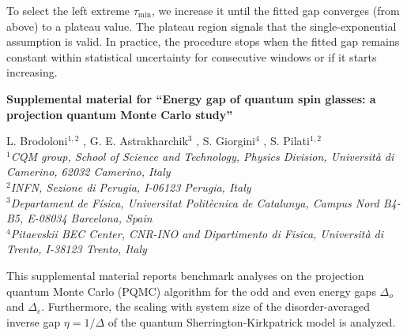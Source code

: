 \documentclass[aps,prl,twocolumn,superscriptaddress,nofootinbib]{revtex4-2}
\begin{document}
To select the left extreme $\tau_{\mathrm{min}}$, we increase it until  the fitted gap converges (from above) to a plateau value. The plateau region signals that the single-exponential assumption is valid. In practice, the procedure stops when the fitted gap remains constant within statistical uncertainty for consecutive windows or  if it starts increasing.






\clearpage
\pagestyle{plain}
\onecolumngrid
\setcounter{page}{1}
\renewcommand{\thefigure}{S\arabic{figure}}
\setcounter{figure}{0}
\begin{center}
  {\large\textbf{Supplemental material for ``Energy gap of quantum spin glasses: a projection quantum Monte Carlo study''}}

  \vspace{2em}
  { L. Brodoloni$^{1,2}$ , G. E. Astrakharchik$^{3}$ , S. Giorgini$^{4}$ , S. Pilati$^{1, 2}$ \\
  $^{1}$\small\textit{CQM group, School of Science and Technology, Physics Division, Università di Camerino, 62032 Camerino, Italy}\\
  $^{2}$\small\textit{INFN, Sezione di Perugia, I-06123 Perugia, Italy}\\
  $^{3}$\small\textit{Departament de Física, Universitat Politècnica de Catalunya, Campus Nord B4-B5, E-08034 Barcelona, Spain}\\
  $^{4}$\small\textit{Pitaevskii BEC Center, CNR-INO and Dipartimento di Fisica, Universit\`a di Trento, I-38123 Trento, Italy}\\
}

\end{center}

\vspace{0.5em}
\begin{center}
\begin{minipage}{0.8\textwidth}
\hspace{10pt} This supplemental material reports benchmark analyses on the projection quantum Monte Carlo (PQMC) algorithm for the odd and even energy gaps $\Delta_o$ and $\Delta_e$. Furthermore, the scaling with system size of the disorder-averaged inverse gap $\eta=1/\Delta$ of the quantum Sherrington-Kirkpatrick model is analyzed.
\end{minipage}
\end{center}
\end{document}
